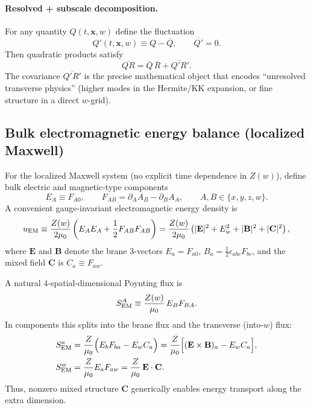 \documentclass[11pt]{article}
\begin{document}
\paragraph{Resolved + subscale decomposition.}
For any quantity \(Q(t,\mathbf{x},w)\) define the fluctuation
\begin{equation}
Q'(t,\mathbf{x},w)\equiv Q-\overline{Q},
\qquad \overline{Q'}=0.
\label{eq:reynolds_decomp_app}
\end{equation}
Then quadratic products satisfy
\begin{equation}
\overline{QR}
=
\overline{Q}\,\overline{R}
+
\overline{Q'R'}.
\label{eq:proj_product_app}
\end{equation}
The covariance \(\overline{Q'R'}\) is the precise mathematical object that encodes
``unresolved transverse physics'' (higher modes in the Hermite/KK expansion, or fine
structure in a direct \(w\)-grid).

\subsection{Bulk electromagnetic energy balance (localized Maxwell)}
\label{app:bulk_poynting}

For the localized Maxwell system (no explicit time dependence in \(Z(w)\)), define
bulk electric and magnetic-type components
\begin{equation}
E_A\equiv F_{A0},
\qquad
F_{AB}=\partial_A A_B-\partial_B A_A,
\qquad A,B\in\{x,y,z,w\}.
\end{equation}
A convenient gauge-invariant electromagnetic energy density is
\begin{equation}
u_{\rm EM}
\equiv
\frac{Z(w)}{2\mu_0}
\left(
E_AE_A+\frac12 F_{AB}F_{AB}
\right)
=
\frac{Z(w)}{2\mu_0}
\left(
|\mathbf{E}|^2 + E_w^2 + |\mathbf{B}|^2 + |\mathbf{C}|^2
\right),
\label{eq:uem_decomp_app}
\end{equation}
where \(\mathbf{E}\) and \(\mathbf{B}\) denote the brane \(3\)-vectors
\(E_a=F_{a0}\), \(B_a=\tfrac12\epsilon_{abc}F_{bc}\), and the mixed field
\(\mathbf{C}\) is \(C_a\equiv F_{aw}\).

A natural \(4\)-spatial-dimensional Poynting flux is
\begin{equation}
S_{\rm EM}^A \equiv \frac{Z(w)}{\mu_0}\,E_B F_{BA}.
\label{eq:poynting_def_app}
\end{equation}
In components this splits into the brane flux and the transverse (into-\(w\)) flux:
\begin{align}
S_{\rm EM}^a
&=
\frac{Z}{\mu_0}\Big(E_b F_{ba}-E_w C_a\Big)
=
\frac{Z}{\mu_0}\Big[(\mathbf{E}\times\mathbf{B})_a - E_w C_a\Big],
\label{eq:poynting_brane_app}
\\
S_{\rm EM}^w
&=
\frac{Z}{\mu_0}E_a F_{aw}
=
\frac{Z}{\mu_0}\,\mathbf{E}\cdot\mathbf{C}.
\label{eq:poynting_w_app}
\end{align}
Thus, nonzero mixed structure \(\mathbf{C}\) generically enables energy transport along
the extra dimension.
\end{document}
